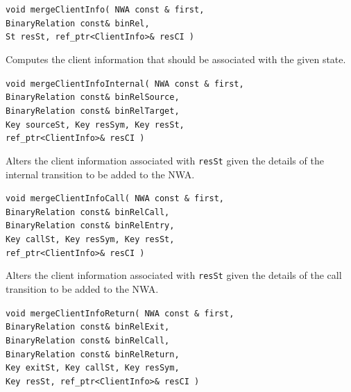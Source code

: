 \begin{description}

  \item\texttt{void mergeClientInfo( NWA const \& first,\\ \hspace*{3.25cm}
    BinaryRelation const\& binRel,\\ \hspace*{3.25cm} St resSt,
    ref\_ptr<ClientInfo>\& resCI )} \nopagebreak

    Computes the client information that should be associated with the given state.

  \item\texttt{void mergeClientInfoInternal( NWA const \& first,\nopagebreak
    \\ \hspace*{3.25cm} BinaryRelation const\& binRelSource,\nopagebreak
    \\ \hspace*{3.25cm} BinaryRelation const\& binRelTarget, \nopagebreak
    \\ \hspace*{3.25cm} Key sourceSt, Key resSym, Key resSt, \nopagebreak
    \\ \hspace*{3.25cm} ref\_ptr<ClientInfo>\& resCI )} \nopagebreak

    Alters the client information associated with \texttt{resSt} given the
    details of the internal transition to be added to the NWA.

  \item\texttt{void mergeClientInfoCall( NWA const \&
    first,\\ \hspace*{3.25cm} BinaryRelation const\&
    binRelCall,\\ \hspace*{3.25cm} BinaryRelation const\&
    binRelEntry,\\ \hspace*{3.25cm} Key callSt, Key resSym, Key
    resSt,\\ \hspace*{3.25cm} ref\_ptr<ClientInfo>\& resCI )} \nopagebreak

    Alters the client information associated with \texttt{resSt} given the
    details of the call transition to be added to the NWA.

  \item\texttt{void mergeClientInfoReturn( NWA const \&
    first,\\ \hspace*{3.25cm} BinaryRelation const\&
    binRelExit,\\ \hspace*{3.25cm} BinaryRelation const\&
    binRelCall,\\ \hspace*{3.25cm} BinaryRelation const\&
    binRelReturn,\\ \hspace*{3.25cm} Key exitSt, Key callSt, Key
    resSym,\\ \hspace*{3.25cm} Key resSt, ref\_ptr<ClientInfo>\& resCI )}
    \nopagebreak


\end{description}
